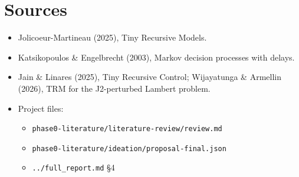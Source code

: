 \documentclass[11pt]{article}
\begin{document}
\section*{Sources}



\begin{itemize}
\item Jolicoeur-Martineau (2025), Tiny Recursive Models.
\item Katsikopoulos \& Engelbrecht (2003), Markov decision processes with delays.
\item Jain \& Linares (2025), Tiny Recursive Control; Wijayatunga \& Armellin (2026), TRM for the J2-perturbed Lambert problem.
\item Project files:
\begin{itemize}
\item \texttt{phase0-literature/\allowbreak{}literature-review/\allowbreak{}review.\allowbreak{}md}
\item \texttt{phase0-literature/\allowbreak{}ideation/\allowbreak{}proposal-final.\allowbreak{}json}
\item \texttt{.\allowbreak{}.\allowbreak{}/\allowbreak{}full\_\allowbreak{}report.\allowbreak{}md} \S{}4
\end{itemize}
\end{itemize}
\end{document}
